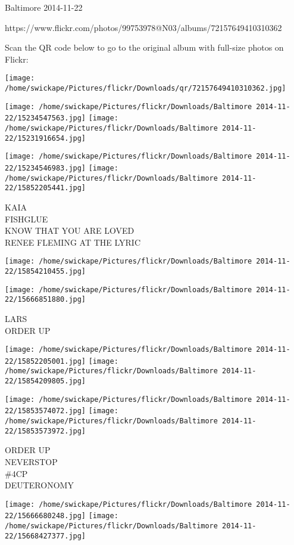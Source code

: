 \documentclass[10pt,letterpaper]{article}
\begin{document}
Baltimore 2014-11-22

https://www.flickr.com/photos/99753978@N03/albums/72157649410310362

Scan the QR code below to go to the original album with full-size photos on Flickr:

\texttt{[image: /home/swickape/Pictures/flickr/Downloads/qr/72157649410310362.jpg]}
\pagebreak

\texttt{[image: /home/swickape/Pictures/flickr/Downloads/Baltimore 2014-11-22/15234547563.jpg]}
\texttt{[image: /home/swickape/Pictures/flickr/Downloads/Baltimore 2014-11-22/15231916654.jpg]}

\texttt{[image: /home/swickape/Pictures/flickr/Downloads/Baltimore 2014-11-22/15234546983.jpg]}
\texttt{[image: /home/swickape/Pictures/flickr/Downloads/Baltimore 2014-11-22/15852205441.jpg]}

KAIA\\
FISHGLUE\\
KNOW THAT YOU ARE LOVED\\
RENEE FLEMING AT THE LYRIC
\pagebreak

\texttt{[image: /home/swickape/Pictures/flickr/Downloads/Baltimore 2014-11-22/15854210455.jpg]}

\vspace{0.25in}
\texttt{[image: /home/swickape/Pictures/flickr/Downloads/Baltimore 2014-11-22/15666851880.jpg]}

LARS\\
ORDER UP
\pagebreak

\texttt{[image: /home/swickape/Pictures/flickr/Downloads/Baltimore 2014-11-22/15852205001.jpg]}
\texttt{[image: /home/swickape/Pictures/flickr/Downloads/Baltimore 2014-11-22/15854209805.jpg]}

\texttt{[image: /home/swickape/Pictures/flickr/Downloads/Baltimore 2014-11-22/15853574072.jpg]}
\texttt{[image: /home/swickape/Pictures/flickr/Downloads/Baltimore 2014-11-22/15853573972.jpg]}

ORDER UP\\
NEVERSTOP\\
\#4CP\\
DEUTERONOMY
\pagebreak

\texttt{[image: /home/swickape/Pictures/flickr/Downloads/Baltimore 2014-11-22/15666680248.jpg]}
\texttt{[image: /home/swickape/Pictures/flickr/Downloads/Baltimore 2014-11-22/15668427377.jpg]}
\end{document}
